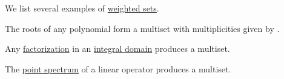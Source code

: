 \begin{example}\label{ex:def:multiset}
  We list several examples of \hyperref[def:labeled_set]{weighted sets}.

  \begin{itemize}
     The roots of any polynomial form a multiset with multiplicities given by .

     Any \hyperref[def:irreducible_factorization]{factorization} in an \hyperref[def:integral_domain]{integral domain} produces a multiset.

     The \hyperref[def:eigenpair]{point spectrum} of a linear operator produces a multiset.
  \end{itemize}
\end{example}
